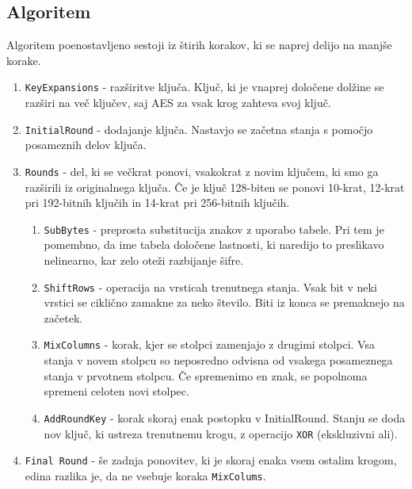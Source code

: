 \subsection{Algoritem}
    Algoritem poenostavljeno sestoji iz štirih korakov, ki se naprej delijo na manjše korake.
    \begin{enumerate}
        \item \texttt{KeyExpansions} - razširitve ključa. Ključ, ki je vnaprej določene dolžine se razširi na več ključev, saj AES za vsak krog zahteva svoj ključ.
        \item \texttt{InitialRound} - dodajanje ključa. Nastavjo se začetna stanja s pomočjo posameznih delov ključa.
        \item \texttt{Rounds} - del, ki se večkrat ponovi, vsakokrat z novim ključem, ki smo ga razširili iz originalnega ključa. Če je ključ 128-biten se ponovi 10-krat, 12-krat pri 192-bitnih ključih in 14-krat pri 256-bitnih ključih.
            \begin{enumerate}
                \item \texttt{SubBytes} - preprosta substitucija znakov z uporabo tabele. Pri tem je pomembno, da ime tabela določene lastnosti, ki naredijo to preslikavo nelinearno, kar zelo oteži razbijanje šifre.
                \item \texttt{ShiftRows} - operacija na vrsticah trenutnega stanja. Vsak bit v neki vrstici se ciklično zamakne za neko število. Biti iz konca se premaknejo na začetek.
                \item \texttt{MixColumns} - korak, kjer se stolpci zamenjajo z drugimi stolpci. Vsa stanja v novem stolpcu so neposredno odvisna od vsakega posameznega stanja v prvotnem stolpcu. Če spremenimo en znak, se popolnoma spremeni celoten novi stolpec.
                \item \texttt{AddRoundKey} - korak skoraj enak postopku v InitialRound. Stanju se doda nov ključ, ki ustreza trenutnemu krogu, z operacijo \texttt{XOR} (ekskluzivni ali).
            \end{enumerate}
        \item \texttt{Final Round} - še zadnja ponovitev, ki je skoraj enaka vsem ostalim krogom, edina razlika je, da ne vsebuje koraka \texttt{MixColums}.\cite{wikipedia-aes}
    \end{enumerate}